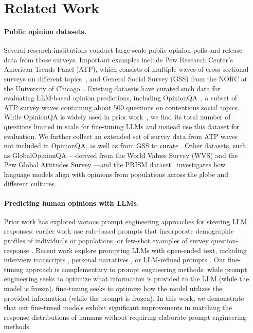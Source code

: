\section{Related Work}
\vspace{-5pt}
\paragraph{Public opinion datasets.}
Several research institutions conduct large-scale public opinion polls and release data from those surveys.
Important examples include Pew Research Center's American Trends Panel (ATP), which consists of multiple waves of cross-sectional surveys on different topics~\cite{atp}, and General Social Survey (GSS) from the NORC at the University of Chicago~\cite{davern2024gss}.
Existing datasets have curated such data for evaluating LLM-based opinion predictions, including OpinionQA~\cite{santurkar2023whose}, a subset of ATP survey waves containing about 500 questions on contentious social topics.
While OpinionQA is widely used in prior work~\cite{he2024community, zhao2023group, li2023steerability, li2024culturellm}, we find its total number of questions limited in scale for fine-tuning LLMs and instead use this dataset for evaluation.
We further collect an extended set of survey data from ATP waves not included in OpinionQA, as well as from GSS to curate \OURDATA.
Other datasets, such as GlobalOpinionQA \cite{durmus2023towards}---derived from the World Values Survey (WVS) \cite{wvs2022}
and the Pew Global Attitudes Survey \citep{pewresearch2024}---and the PRISM dataset~\cite{kirk2024prism} 
investigates how language models align with opinions from populations across the globe and different cultures.

\vspace{-5pt}
\paragraph{Predicting human opinions with LLMs.}
Prior work has explored various prompt engineering approaches for steering LLM responses: earlier work use rule-based prompts that incorporate demographic profiles of individuals or populations, or few-shot examples of survey question-response \cite{hwang2023aligning, simmons2022moral, santurkar2023whose, dominguez2023questioning}. Recent work explore prompting LLMs with open-ended text, including interview transcripts \cite{park2024generative}, personal narratives \cite{moon-etal-2024-virtual}, or LLM-refined prompts \cite{kim2024few, sun2024persona}.
Our fine-tuning approach is complementary to prompt engineering methods: while prompt engineering seeks to optimize what information is provided to the LLM (while the model is frozen), fine-tuning seeks to optimize how the model utilizes the provided information (while the prompt is frozen).
In this work, we demonstrate that our fine-tuned models exhibit significant improvements in matching the response distributions of humans without requiring elaborate prompt engineering methods.

